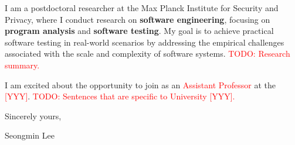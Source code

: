 \documentclass{article}
\newcommand{\fixme}[1]{\textcolor{red}{#1}}
\begin{document}
I am a postdoctoral researcher at the Max Planck Institute for Security and Privacy, where I conduct research on \textbf{software engineering}, focusing on \textbf{program analysis} and \textbf{software testing}. My goal is to achieve practical software testing in real-world scenarios by addressing the empirical challenges associated with the scale and complexity of software systems. \fixme{TODO: Research summary.}


I am excited about the opportunity to join as an \fixme{Assistant Professor} at the \fixme{[YYY]}.
\fixme{TODO: Sentences that are specific to University [YYY].}






\bigskip %

Sincerely yours,

\vspace{50pt} %

Seongmin Lee
\end{document}
